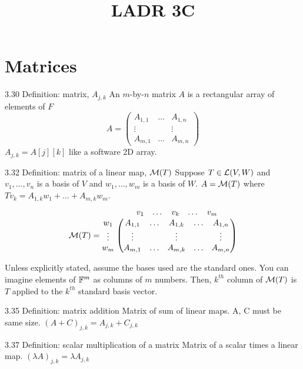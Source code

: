 \documentclass[12pt, letterpaper]{article}
\title{LADR 3C}
\begin{document}
\maketitle

\section*{Matrices}

\begin{imp}
{3.30 Definition: matrix, $A_{j,k}$}
An $m$-by-$n$ matrix $A$ is a rectangular array of elements of $F$
$$A=\begin{pmatrix}
A_{1,1} & \dots & A_{1,n}\\
\vdots & { } & \vdots\\
A_{m,1} & \dots & A_{m,n}
\end{pmatrix}$$
$A_{j,k}=A[j][k]$ like a software 2D array.
\end{imp}

\begin{imp}
{3.32 Definition: matrix of a linear map, $\mathcal{M}(T)$}
Suppose $T\in\mathcal{L}(V,W)$ and 
$v_1,\dots,v_n$ is a basis of $V$ and 
$w_1,\dots,w_m$ is a basis of $W$.
$A=\mathcal{M}(T)$ where $Tv_k=A_{1,k}w_1+\dots+A_{m,k}w_m$. 
$$\mathcal{M}(T)=
\begin{matrix}
w_1\\\vdots\\w_m
\end{matrix}
\stackrel{
\begin{matrix}
  v_1 & \dots & v_k & \dots & v_m
\end{matrix}
}{
\begin{pmatrix}
{A_{1,1}} & {\dots} & A_{1,k} & {\dots} & {A_{1,n}}\\
{\vdots} & { } & \vdots & { } & {\vdots}\\
{A_{m,1}} & {\dots} & A_{m,k} & {\dots} & {A_{m,n}}
\end{pmatrix}
}$$
\end{imp}
Unless explicitly stated, assume the bases used are the standard ones.
You can imagine elements of $\mathbb{F}^m$ as columns of $m$ numbers.
Then, $k^{th}$ column of $\mathcal{M}(T)$ is $T$ applied to the $k^{th}$ standard basis vector.

\begin{imp}
{3.35 Definition: matrix addition}
Matrix of sum of linear maps. A, C must be same size. 
$(A+C)_{j,k}=A_{j,k}+C_{j,k}$
\end{imp}

\begin{imp}
{3.37 Definition: scalar multiplication of a matrix}
Matrix of a scalar times a linear map. 
$(\lambda A)_{j,k}=\lambda A_{j,k}$
\end{imp}
\end{document}
